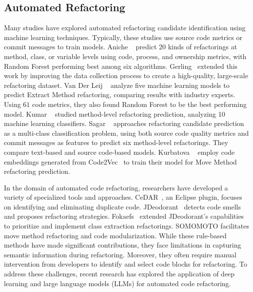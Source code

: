 

\subsection{Automated Refactoring}

Many studies have explored automated refactoring candidate identification using machine learning techniques. Typically, these studies use source code metrics or commit messages to train models. Aniche \etal{}~\cite{Aniche2020Effectiveness} predict $20$ kinds of refactorings at method, class, or variable levels using code, process, and ownership metrics, with Random Forest performing best among six algorithms. Gerling~\cite{Gerling2020Machine} extended this work by improving the data collection process to create a high-quality, large-scale refactoring dataset. Van Der Leij \etal{}~\cite{van2021data} analyze five machine learning models to predict Extract Method refactoring, comparing results with industry experts. Using $61$ code metrics, they also found Random Forest to be the best performing model. Kumar \etal{}~\cite{Kumar2019Method} studied method-level refactoring prediction, analyzing 10 machine learning classifiers. Sagar \etal{}~\cite{Sagar2021Comparing} approaches refactoring candidate prediction as a multi-class classification problem, using both source code quality metrics and commit messages as features to predict six method-level refactorings. They compare text-based and source code-based models. Kurbatova \etal{}~\cite{Kurbatova2020Recommendation} employ code embeddings generated from Code2Vec~\cite{Alon2019Code2vec} to train their model for Move Method refactoring prediction.

In the domain of automated code refactoring, researchers have developed a variety of specialized tools and approaches. CeDAR~\cite{tairas2012cedar}, an Eclipse plugin, focuses on identifying and eliminating duplicate code. JDeodorant~\cite{JDeodrant, mazinanian2016jdeodorant} detects code smells and proposes refactoring strategies. Fokaefs~\etal{}\cite{fokaefs2012identification} extended JDeodorant's capabilities to prioritize and implement class extraction refactorings. SOMOMOTO\cite{zanetti2014automated} facilitates move method refactoring and code modularization. While these rule-based methods have made significant contributions, they face limitations in capturing semantic information during refactoring. Moreover, they often require manual intervention from developers to identify and select code blocks for refactoring. To address these challenges, recent research has explored the application of deep learning and large language models (LLMs) for automated code refactoring.

